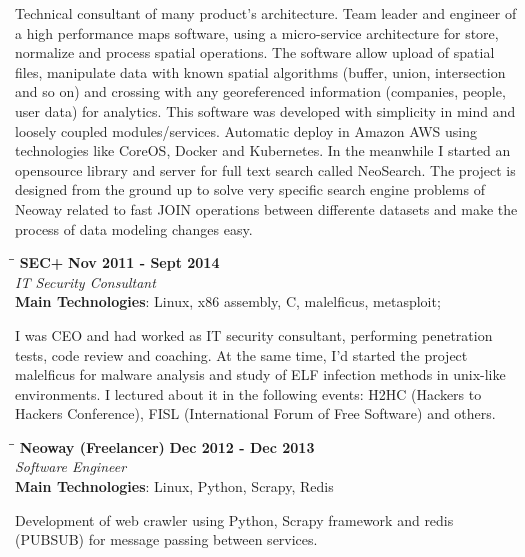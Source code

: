 \documentclass[margin]{res}
\begin{document}
\begin{resume}
    
  Technical consultant of many product's architecture. Team leader and engineer of a high performance maps software, using a micro-service architecture for store, normalize and process spatial operations. The software allow upload of spatial files, manipulate data with known spatial algorithms (buffer, union, intersection and so on) and crossing with any georeferenced information (companies, people, user data) for analytics.
This software was developed with simplicity in mind and loosely coupled modules/services. Automatic deploy in Amazon AWS using technologies like CoreOS, Docker and Kubernetes.
    In the meanwhile I started an opensource library and server for full text search called NeoSearch. The project is designed from the ground up to solve very specific search engine problems of Neoway related to fast JOIN operations between differente datasets and make the process of data modeling changes easy.

\vspace{-0.1in}

\vspace{-0.1in}
   \begin{tabbing}
   \hspace{2.3in}\= \hspace{1.7in}\= \kill %
    \textbf{SEC+}    \>\>\textbf{Nov 2011 - Sept 2014}\\
    \textit{IT Security Consultant}\\        
    \textbf{Main Technologies}: Linux, x86 assembly, C, malelficus, metasploit;
   \end{tabbing}\vspace{-20pt}      %
    \vspace{2mm}
        I was CEO and had worked as IT security consultant, performing penetration tests, code review and coaching. At the same time, I’d started the project malelficus for malware analysis and study of ELF infection methods in unix-like environments. I lectured about it in the following events: H2HC (Hackers to Hackers Conference), FISL (International Forum of Free Software) and others.

\vspace{-0.1in}

   \begin{tabbing}
   \hspace{2.3in}\= \hspace{1.7in}\= \kill %
    \textbf{Neoway (Freelancer)}    \>\>\textbf{Dec 2012 - Dec 2013}\\
    \textit{Software Engineer}\\        
    \textbf{Main Technologies}: Linux, Python, Scrapy, Redis
   \end{tabbing}\vspace{-20pt}      %
    \vspace{2mm}
 Development of web crawler using Python, Scrapy framework and redis (PUBSUB) for message passing between services.
     


\end{resume}
\end{document}

